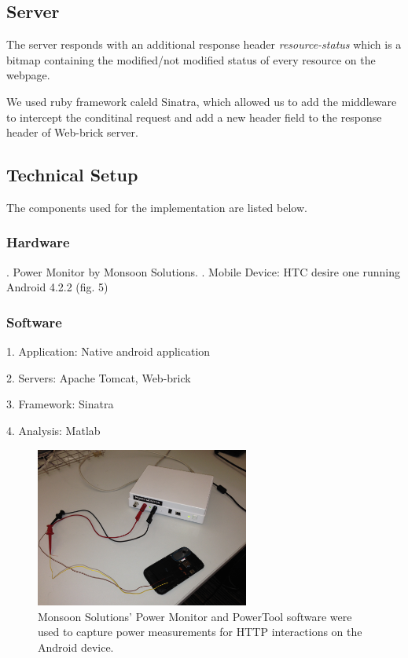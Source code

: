 \documentclass{sigplanconf}
\begin{document}
\subsection{Server}

The server responds with an additional response header {\it resource-status} which is a bitmap containing the modified/not modified status of every resource on the webpage. 

We used ruby framework caleld Sinatra, which allowed us to add the middleware to intercept the conditinal request and add a new header field to the response header of Web-brick server.

\subsection{Technical Setup}
The components used for the implementation are listed below.

\subsubsection{Hardware}

. Power Monitor by Monsoon Solutions. . Mobile Device: HTC desire one running Android 4.2.2 (fig. 5)

\subsubsection{Software}

1. Application: Native android application

2. Servers: Apache Tomcat, Web-brick

3. Framework: Sinatra

4. Analysis: Matlab

\begin{figure}[ht!]
\centering
\includegraphics[width=70mm]{monitor.jpg}
\caption{Monsoon Solutions’ Power Monitor and PowerTool software were used to capture power measurements for HTTP interactions on the Android device. }
\label{fig:sp_gd_mnist}
\end{figure}
\end{document}
